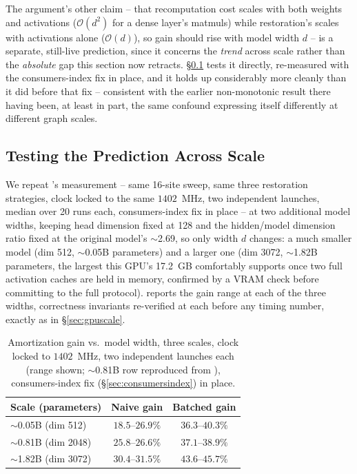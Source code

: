 \documentclass{article}
\begin{document}
The argument's other claim -- that recomputation cost scales with both weights and activations
($\mathcal{O}(d^2)$ for a dense layer's matmuls) while restoration's scales with activations alone
($\mathcal{O}(d)$), so gain should rise with model width $d$ -- is a separate, still-live
prediction, since it concerns the \emph{trend} across scale rather than the \emph{absolute} gap
this section now retracts. \S\ref{sec:multiscale} tests it directly, re-measured with the
consumers-index fix in place, and it holds up considerably more cleanly than it did before that
fix -- consistent with the earlier non-monotonic result there having been, at least in part, the
same confound expressing itself differently at different graph scales.

\subsection{Testing the Prediction Across Scale}
\label{sec:multiscale}

We repeat 's measurement -- same 16-site sweep, same three restoration
strategies, clock locked to the same $1402$~MHz, two independent launches, median over 20 runs
each, consumers-index fix in place -- at two additional model widths, keeping head dimension fixed
at 128 and the hidden/model dimension ratio fixed at the original model's $\sim$2.69, so only width
$d$ changes: a much smaller model (dim 512, $\sim$0.05B parameters) and a larger one (dim 3072,
$\sim$1.82B parameters, the largest this GPU's 17.2~GB comfortably supports once two full
activation caches are held in memory, confirmed by a VRAM check before committing to the full
protocol).  reports the gain range at each of the three widths, correctness
invariants re-verified at each before any timing number, exactly as in \S\ref{sec:gpuscale}.

\begin{table}[H]
\centering
\caption{Amortization gain vs.\ model width, three scales, clock locked to $1402$~MHz, two
independent launches each (range shown; $\sim$0.81B row reproduced from ),
consumers-index fix (\S\ref{sec:consumersindex}) in place.}
\label{tab:multiscale}
\begin{tabular}{l c c}
\toprule
\textbf{Scale (parameters)} & \textbf{Naive gain} & \textbf{Batched gain} \\
\midrule
$\sim$0.05B (dim 512) & $18.5$--$26.9\%$ & $36.3$--$40.3\%$ \\
\rowcolor{rowgray}
$\sim$0.81B (dim 2048) & $25.8$--$26.6\%$ & $37.1$--$38.9\%$ \\
$\sim$1.82B (dim 3072) & $30.4$--$31.5\%$ & $\mathbf{43.6}$--$\mathbf{45.7\%}$ \\
\bottomrule
\end{tabular}
\end{table}
\end{document}
